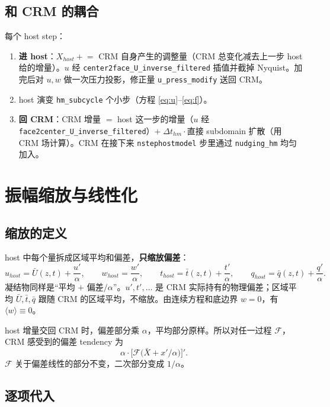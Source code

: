 \documentclass[11pt,a4paper]{article}
\newcommand{\code}[1]{\texttt{#1}}
\newcommand{\avg}[1]{\langle #1\rangle}
\begin{document}
\subsection{和 CRM 的耦合}

每个 host step：
\begin{enumerate}[leftmargin=1.5em,itemsep=2pt]
\item \textbf{进 host}：$X_{host} \mathrel{+}= $ CRM 自身产生的调整量（CRM 总变化减去上一步 host 给的增量）。$u$ 经 \code{center2face\_U\_inverse\_filtered} 插值并截掉 Nyquist。加完后对 $u,w$ 做一次压力投影，修正量 \code{u\_press\_modify} 送回 CRM。
\item host 演变 \code{hm\_subcycle} 个小步（方程 \eqref{eq:u}--\eqref{eq:f}）。
\item \textbf{回 CRM}：CRM 增量 $=$ host 这一步的增量（$u$ 经 \code{face2center\_U\_inverse\_filtered}）$+\;\Delta t_{hm}\cdot$直接 subdomain 扩散（用 CRM 场计算）。CRM 在接下来 \code{nstephostmodel} 步里通过 \code{nudging\_hm} 均匀加入。
\end{enumerate}

\section{振幅缩放与线性化}

\subsection{缩放的定义}

host 中每个量拆成区域平均和偏差，\textbf{只缩放偏差}：
\begin{equation}
u_{host} = \bar U(z,t) + \frac{u'}{\alpha},\qquad
w_{host} = \frac{w'}{\alpha},\qquad
t_{host} = \bar t(z,t) + \frac{t'}{\alpha},\qquad
q_{host} = \bar q(z,t) + \frac{q'}{\alpha}.
\end{equation}
凝结物同样是“平均 $+$ 偏差$/\alpha$”。$u',t',\dots$ 是 CRM 实际持有的物理偏差；区域平均 $\bar U,\bar t,\bar q$ 跟随 CRM 的区域平均，不缩放。由连续方程和底边界 $w=0$，有 $\avg{w}\equiv 0$。

host 增量交回 CRM 时，偏差部分乘 $\alpha$，平均部分原样。所以对任一过程 $\mathcal{F}$，CRM 感受到的偏差 tendency 为
\begin{equation}
\alpha\cdot\Big[\mathcal{F}\big(\bar X + x'/\alpha\big)\Big]' .
\end{equation}
$\mathcal{F}$ 关于偏差线性的部分不变，二次部分变成 $1/\alpha$。

\subsection{逐项代入}
\end{document}
